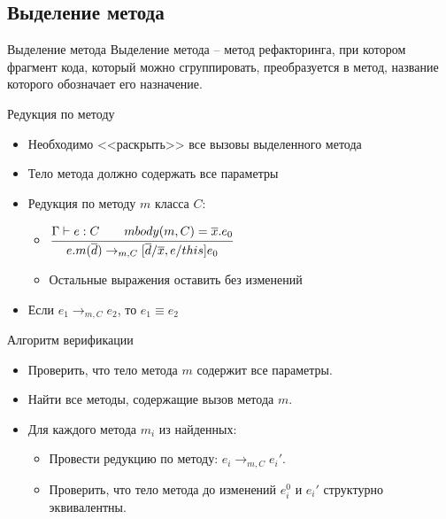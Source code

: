 \documentclass[hyperref=unicode,graphics=pdflatex,13pt]{beamer}
\begin{document}
\subsection{Выделение метода}
\begin{frame}{Выделение метода}
Выделение метода -- метод рефакторинга, при котором фрагмент кода, который можно сгруппировать, преобразуется в метод, название которого обозначает его назначение.
\end{frame}

\begin{frame}{Редукция по методу}
\begin{itemize}
    \item Необходимо <<раскрыть>> все вызовы выделенного метода
    \item Тело метода должно содержать все параметры
    \item Редукция по методу $m$ класса $C$:
    \begin{itemize}
        \item $\cfrac{\Gamma \vdash e : C \qquad mbody(m, C) = \overline{x}.e_0}{e.m(\overline{d}) \rightarrow_{m,C} [\overline{d}/\overline{x}, e/this]e_0}$
        \item Остальные выражения оставить без изменений
    \end{itemize}
    \item Если $e_1 \rightarrow_{m,C} e_2$, то $e_1 \equiv e_2$
\end{itemize}
\end{frame}

\begin{frame}{Алгоритм верификации}
\begin{itemize}
    \item Проверить, что тело метода $m$ содержит все параметры.
    \item Найти все методы, содержащие вызов метода $m$.
    \item Для каждого метода $m_i$ из найденных:
    \begin{itemize}
        \item Провести редукцию по методу: $e_i \rightarrow_{m,C} e_i'$.
        \item Проверить, что тело метода до изменений $e_i^0$ и $e_i'$ структурно эквивалентны.
    \end{itemize}
\end{itemize}
\end{frame}

\lstset{
    language=Java,
    basicstyle=\small\ttfamily,
    frame=single,
    captionpos=b
}
\end{document}
